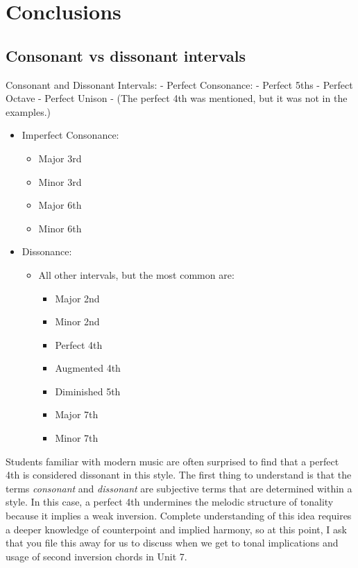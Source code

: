 \documentclass{book}
\providecommand{\tightlist}{%
  \setlength{\itemsep}{0pt}\setlength{\parskip}{0pt}}
\begin{document}
\hypertarget{conclusions-15}{%
\section{Conclusions}\label{conclusions-15}}

\hypertarget{consonant-vs-dissonant-intervals}{%
\subsection{Consonant vs dissonant
intervals}\label{consonant-vs-dissonant-intervals}}

Consonant and Dissonant Intervals: - Perfect Consonance: - Perfect 5ths -
Perfect Octave - Perfect Unison - (The perfect 4th was mentioned, but it was
not in the examples.)

\begin{itemize}
\tightlist
\item
  Imperfect Consonance:

  \begin{itemize}
  \tightlist
  \item
    Major 3rd
  \item
    Minor 3rd
  \item
    Major 6th
  \item
    Minor 6th
  \end{itemize}
\item
  Dissonance:

  \begin{itemize}
  \tightlist
  \item
    All other intervals, but the most common are:

    \begin{itemize}
    \tightlist
    \item
      Major 2nd
    \item
      Minor 2nd
    \item
      Perfect 4th
    \item
      Augmented 4th
    \item
      Diminished 5th
    \item
      Major 7th
    \item
      Minor 7th
    \end{itemize}
  \end{itemize}
\end{itemize}

Students familiar with modern music are often surprised to find that a perfect
4th is considered dissonant in this style. The first thing to understand is
that the terms \emph{consonant} and \emph{dissonant} are subjective terms that
are determined within a style. In this case, a perfect 4th undermines the
melodic structure of tonality because it implies a weak inversion. Complete
understanding of this idea requires a deeper knowledge of counterpoint and
implied harmony, so at this point, I ask that you file this away for us to
discuss when we get to tonal implications and usage of second inversion chords
in Unit 7.
\end{document}
